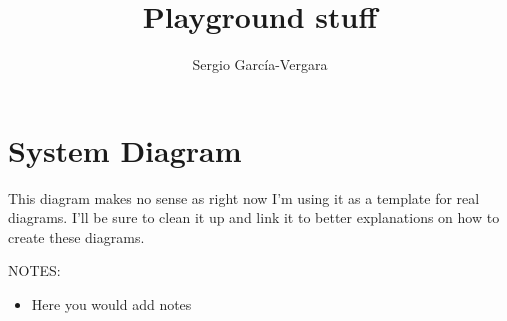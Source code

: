 \documentclass{llncs}
\begin{document}



\title{Playground stuff}

\author{Sergio Garc\'{i}a-Vergara}


\maketitle









\section{System Diagram}

This diagram makes no sense as right now I'm using it as a template for real
diagrams. I'll be sure to clean it up and link it to better explanations on how
to create these diagrams.

\vspace{1em}
\noindent NOTES:
\begin{itemize}
  \item Here you would add notes
\end{itemize}
\end{document}

